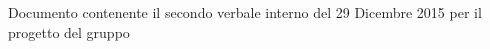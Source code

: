 Documento contenente il secondo verbale interno del 29 Dicembre 2015 per il progetto \progetto{} del gruppo \gruppo

